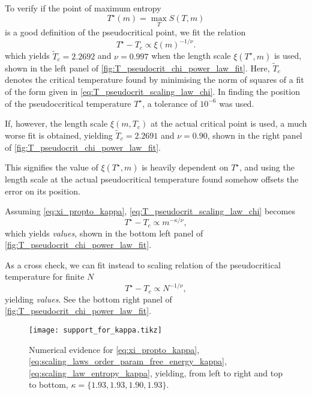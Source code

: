 To verify if the point of maximum entropy
\begin{equation}
  T^{\star}(m) = \max_{T} S(T, m)
\end{equation}
is a good definition of the pseudocritical point, we fit the relation
\begin{equation}\label{eq:T_pseudocrit_scaling_law_chi}
  T^{\star} - T_c \propto \xi(m)^{-1 / \nu}.
\end{equation}
which yields $\widetilde{T}_c = 2.2692$ and $\nu = 0.997$ when the length scale $\xi(T^{\star}, m)$ is used, shown in
the left panel of \autoref{fig:T_pseudocrit_chi_power_law_fit}. Here, $\widetilde{T}_c$ denotes the critical temperature
found by minimising the norm of squares of a fit of the form given in \autoref{eq:T_pseudocrit_scaling_law_chi}. In
finding the position of the pseudoccritical temperature $T^{\star}$, a tolerance of $10^{-6}$ was used.

If, however, the length scale $\xi(m, T_c)$ at the actual critical point is used, a much worse fit is obtained, yielding
$\widetilde{T}_c = 2.2691$ and $\nu = 0.90$, shown in the right panel of
\autoref{fig:T_pseudocrit_chi_power_law_fit}.

This signifies the value of $\xi(T^{\star}, m)$ is heavily dependent on
$T^{\star}$, and using the length scale at the actual pseudocritical temperature found somehow offsets the error on its
position.

Assuming \autoref{eq:xi_propto_kappa}, \autoref{eq:T_pseudocrit_scaling_law_chi} becomes
\begin{equation}
  T^{\star} - T_c \propto m^{-\kappa / \nu},
\end{equation}
which yields \emph{values}, shown in the bottom left panel of \autoref{fig:T_pseudocrit_chi_power_law_fit}.

As a cross check, we can fit instead to scaling relation of the pseudocritical temperature for finite $N$
\begin{equation}
  T^{\star} - T_c \propto N^{-1/\nu},
\end{equation}
yielding \emph{values}. See the bottom right panel of \autoref{fig:T_pseudocrit_chi_power_law_fit}.




\begin{figure}
  \texttt{[image: support\_for\_kappa.tikz]}
  \caption{Numerical evidence for \autoref{eq:xi_propto_kappa}, \autoref{eq:scaling_laws_order_param_free_energy_kappa},
  \autoref{eq:scaling_law_entropy_kappa}, yielding, from left to right and top to bottom, $\kappa = \{ 1.93, 1.93, 1.90,
  1.93 \}$.}\label{fig:support_for_kappa}
\end{figure}

